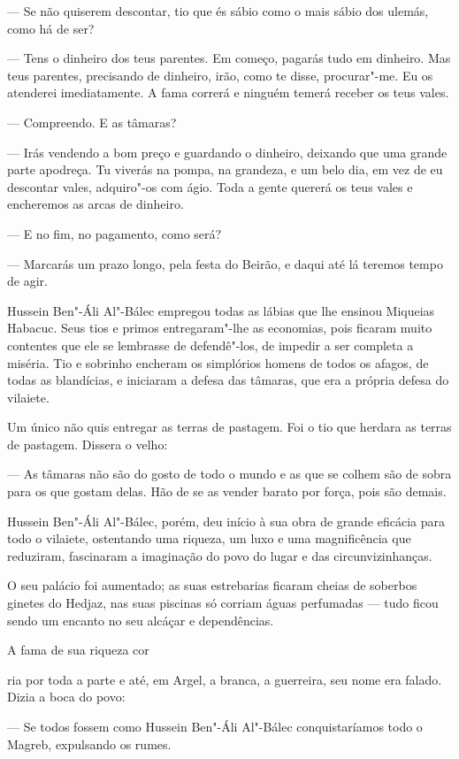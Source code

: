 --- Se não quiserem descontar, tio que és sábio como o mais sábio dos
ulemás, como há de ser?

--- Tens o dinheiro dos teus parentes. Em começo, pagarás tudo em
dinheiro. Mas teus parentes, precisando de dinheiro, irão, como te
disse, procurar"-me. Eu os atenderei imediatamente. A fama correrá e
ninguém temerá receber os teus vales.

--- Compreendo. E as tâmaras?

--- Irás vendendo a bom preço e guardando o dinheiro, deixando que uma
grande parte apodreça. Tu viverás na pompa, na grandeza, e um belo dia,
em vez de eu descontar vales, adquiro"-os com ágio. Toda a gente quererá
os teus vales e encheremos as arcas de dinheiro.

--- E no fim, no pagamento, como será?

--- Marcarás um prazo longo, pela festa do Beirão, e daqui até lá
teremos tempo de agir.

Hussein Ben"-Áli Al"-Bálec empregou todas as lábias que lhe ensinou
Miqueias Habacuc. Seus tios e primos entregaram"-lhe as economias, pois
ficaram muito contentes que ele se lembrasse de defendê"-los, de impedir
a ser completa a miséria. Tio e sobrinho encheram os simplórios homens
de todos os afagos, de todas as blandícias, e iniciaram a defesa das
tâmaras, que era a própria defesa do vilaiete.

Um único não quis entregar as terras de pastagem. Foi o tio que herdara
as terras de pastagem. Dissera o velho:

--- As tâmaras não são do gosto de todo o mundo e as que se colhem são
de sobra para os que gostam delas. Hão de se as vender barato por força,
pois são demais.

Hussein Ben"-Áli Al"-Bálec, porém, deu início à sua obra de grande
eficácia para todo o vilaiete, ostentando uma riqueza, um luxo e uma
magnificência que reduziram, fascinaram a imaginação do povo do lugar e
das circunvizinhanças.

O seu palácio foi aumentado; as suas estrebarias ficaram cheias de
soberbos ginetes do Hedjaz, nas suas piscinas só corriam águas
perfumadas --- tudo ficou sendo um encanto no seu alcáçar e
dependências.

A fama de sua riqueza cor

ria por toda a parte e até, em Argel, a branca, a guerreira, seu nome
era falado. Dizia a boca do povo:

--- Se todos fossem como Hussein Ben"-Áli Al"-Bálec conquistaríamos todo o
Magreb, expulsando os rumes.

